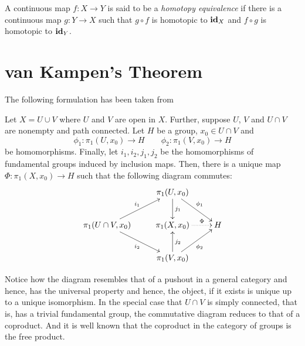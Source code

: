 \begin{definition}
    A continuous map $f: X\to Y$ is said to be a \emph{homotopy equivalence} if there is a continuous map $g: Y\to X$ such that $g\circ f$ is homotopic to $\mathbf{id}_X$ and $f\circ g$ is homotopic to $\mathbf{id}_Y$.
\end{definition}

\section{van Kampen's Theorem}

The following formulation has been taken from \cite{munkrestopology}

\begin{theorem}
    Let $X = U\cup V$ where $U$ and $V$ are open in $X$. Further, suppose $U$, $V$ and $U\cap V$ are nonempty and path connected. Let $H$ be a group, $x_0\in U\cap V$ and 
    \begin{equation*}
        \phi_1:\pi_1(U,x_0)\to H\qquad\phi_2:\pi_1(V, x_0)\to H
    \end{equation*}
    be homomorphisms. Finally, let $i_1,i_2,j_1,j_2$ be the homomorphisms of fundamental groups induced by inclusion maps. Then, there is a unique map $\Phi:\pi_1(X,x_0)\to H$ such that the following diagram commutes:
    \begin{equation*}
        \xymatrix {
            & \pi_1(U,x_0)\ar[d]^{j_1}\ar[rd]^{\phi_1}\\
            \pi_1(U\cap V, x_0)\ar[ru]^{i_1}\ar[rd]_{i_2} & \pi_1(X,x_0)\ar@{.>}[r]^-{\Phi} & H\\
            & \pi_1(V,x_0)\ar[ru]_{\phi_2}\ar[u]_{j_2}
        }
    \end{equation*}
\end{theorem}

Notice how the diagram resembles that of a pushout in a general category and hence, has the universal property and hence, the object, if it exists is unique up to a unique isomorphism. In the special case that $U\cap V$ is simply connected, that is, has a trivial fundamental group, the commutative diagram reduces to that of a coproduct. And it is well known that the coproduct in the category of groups is the free product.

